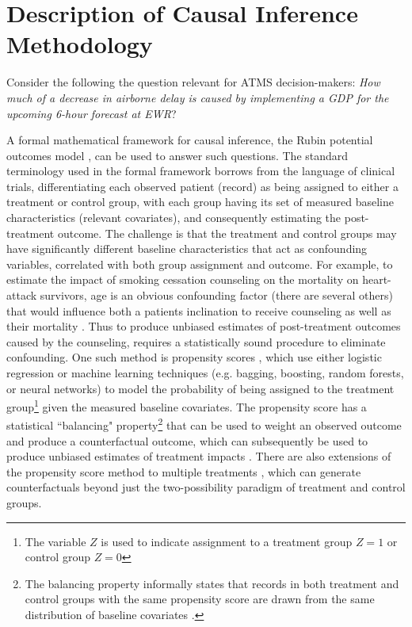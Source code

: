 \documentclass[11pt]{scrartcl}
\begin{document}
\section{Description of Causal Inference Methodology}
Consider the following the question relevant for ATMS decision-makers: \emph{How much of a decrease in airborne delay is caused by implementing a GDP for the upcoming 6-hour forecast at EWR}?   

A formal mathematical framework for causal inference, the Rubin potential outcomes model \cite{rubin1974estimating}, can be used to answer such questions.  The standard terminology used in the formal framework borrows from the language of clinical trials, differentiating each observed patient (record) as being assigned to either a treatment or control group, with each group having its set of measured baseline characteristics (relevant covariates), and consequently estimating the post-treatment outcome. The challenge is that the treatment and control groups may have significantly different baseline characteristics that act as confounding variables, correlated with both group assignment and outcome.  For example, to estimate the impact of smoking cessation counseling on the mortality on heart-attack survivors, age is an obvious confounding factor (there are several others) that would influence both a patients inclination to receive counseling as well as their mortality \cite{austin2011tutorial}.  Thus to produce unbiased estimates of post-treatment outcomes caused by the counseling, requires a statistically sound procedure to eliminate confounding.  One such method is propensity scores \cite{austin2011introduction}, which use either logistic regression or machine learning techniques (e.g. bagging, boosting, random forests, or neural networks) to model the probability of being assigned to the treatment group\footnote{The variable $Z$ is used to indicate assignment to a treatment group $Z=1$ or control group $Z=0$} given the measured baseline covariates.  The propensity score has a statistical ``balancing" property\footnote{
The balancing property informally states that records in both treatment and control groups with the same propensity score are drawn from the same distribution of baseline covariates \cite{austin2011introduction}.} that can be used to weight an observed outcome and produce a counterfactual outcome, which can subsequently be used to produce unbiased estimates of treatment impacts \cite{austin2011introduction}.  There are also extensions of the propensity score method to multiple treatments \cite{mccaffrey2013tutorial}, which can generate counterfactuals beyond just the two-possibility paradigm of treatment and control groups.  
\end{document}
